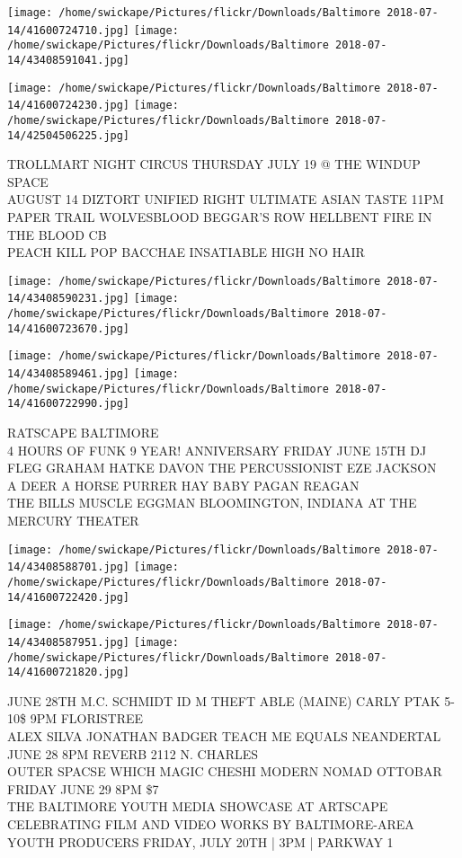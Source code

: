 \documentclass[10pt,letterpaper]{article}
\begin{document}
\texttt{[image: /home/swickape/Pictures/flickr/Downloads/Baltimore 2018-07-14/41600724710.jpg]}
\texttt{[image: /home/swickape/Pictures/flickr/Downloads/Baltimore 2018-07-14/43408591041.jpg]}

\texttt{[image: /home/swickape/Pictures/flickr/Downloads/Baltimore 2018-07-14/41600724230.jpg]}
\texttt{[image: /home/swickape/Pictures/flickr/Downloads/Baltimore 2018-07-14/42504506225.jpg]}

TROLLMART NIGHT CIRCUS THURSDAY JULY 19 @ THE WINDUP SPACE\\
AUGUST 14 DIZTORT UNIFIED RIGHT ULTIMATE ASIAN TASTE 11PM\\
PAPER TRAIL WOLVESBLOOD BEGGAR'S ROW HELLBENT FIRE IN THE BLOOD CB\\
PEACH KILL POP BACCHAE INSATIABLE HIGH NO HAIR\\
\pagebreak

\texttt{[image: /home/swickape/Pictures/flickr/Downloads/Baltimore 2018-07-14/43408590231.jpg]}
\texttt{[image: /home/swickape/Pictures/flickr/Downloads/Baltimore 2018-07-14/41600723670.jpg]}

\texttt{[image: /home/swickape/Pictures/flickr/Downloads/Baltimore 2018-07-14/43408589461.jpg]}
\texttt{[image: /home/swickape/Pictures/flickr/Downloads/Baltimore 2018-07-14/41600722990.jpg]}

RATSCAPE BALTIMORE\\
4 HOURS OF FUNK 9 YEAR! ANNIVERSARY FRIDAY JUNE 15TH DJ FLEG GRAHAM HATKE DAVON THE PERCUSSIONIST EZE JACKSON\\
A DEER A HORSE PURRER HAY BABY PAGAN REAGAN\\
THE BILLS MUSCLE EGGMAN BLOOMINGTON, INDIANA AT THE MERCURY THEATER\\
\pagebreak

\texttt{[image: /home/swickape/Pictures/flickr/Downloads/Baltimore 2018-07-14/43408588701.jpg]}
\texttt{[image: /home/swickape/Pictures/flickr/Downloads/Baltimore 2018-07-14/41600722420.jpg]}

\texttt{[image: /home/swickape/Pictures/flickr/Downloads/Baltimore 2018-07-14/43408587951.jpg]}
\texttt{[image: /home/swickape/Pictures/flickr/Downloads/Baltimore 2018-07-14/41600721820.jpg]}

JUNE 28TH M.C. SCHMIDT ID M THEFT ABLE (MAINE) CARLY PTAK 5{-}10\$ 9PM FLORISTREE\\
ALEX SILVA JONATHAN BADGER TEACH ME EQUALS NEANDERTAL JUNE 28 8PM REVERB 2112 N. CHARLES\\
OUTER SPACSE WHICH MAGIC CHESHI MODERN NOMAD OTTOBAR FRIDAY JUNE 29 8PM \$7\\
THE BALTIMORE YOUTH MEDIA SHOWCASE AT ARTSCAPE CELEBRATING FILM AND VIDEO WORKS BY BALTIMORE{-}AREA YOUTH PRODUCERS FRIDAY, JULY 20TH | 3PM | PARKWAY 1\\
\pagebreak
\end{document}
